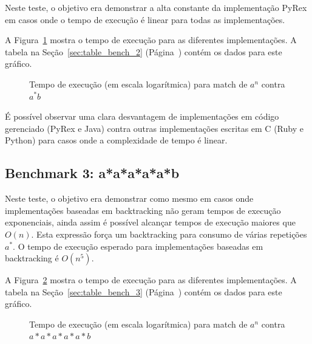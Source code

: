 \documentclass[a4paper,12pt,oneside,onecolumn]{uerj}
\begin{document}
Neste teste, o objetivo era demonstrar a alta constante da implementação PyRex em casos onde o tempo de execução é linear para todas as implementações.

A Figura~\ref{fig:graph_bench_2} mostra o tempo de execução para as diferentes implementações. A tabela na Seção~\ref{sec:table_bench_2} (Página~\pageref{sec:table_bench_2}) contém os dados para este gráfico.

\begin{figure}[!htbp]
\centering
{}
\caption{Tempo de execução (em escala logarítmica) para match de $a^n$ contra $a^*b$}
\label{fig:graph_bench_2}
\end{figure}

É possível observar uma clara desvantagem de implementações em código gerenciado (PyRex e Java) contra outras implementações escritas em C (Ruby e Python) para casos onde a complexidade de tempo é linear.

\subsection{Benchmark 3: a*a*a*a*a*b}

Neste teste, o objetivo era demonstrar como mesmo em casos onde implementações baseadas em backtracking não geram tempos de execução exponenciais, ainda assim é possível alcançar tempos de execução maiores que $O(n)$. Esta expressão força um backtracking para consumo de várias repetições $a^*$. O tempo de execução esperado para implementações baseadas em backtracking é $O(n^5)$.

A Figura~\ref{fig:graph_bench_3} mostra o tempo de execução para as diferentes implementações. A tabela na Seção~\ref{sec:table_bench_3} (Página~\pageref{sec:table_bench_3}) contém os dados para este gráfico.

\begin{figure}[!htbp]
\centering
{}
\caption{Tempo de execução (em escala logarítmica) para match de $a^n$ contra $a*a*a*a*a*b$}
\label{fig:graph_bench_3}
\end{figure}
\end{document}
